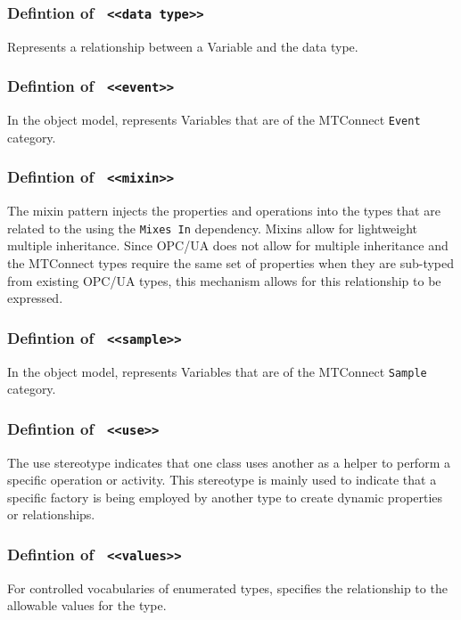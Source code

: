 \FloatBarrier
\FloatBarrier
\subsubsection{Defintion of \texttt{ <<data type>>}}
  \label{type:data type}

\FloatBarrier

Represents a relationship between a Variable and the data type.

\FloatBarrier
\subsubsection{Defintion of \texttt{ <<event>>}}
  \label{type:event}

\FloatBarrier

In the object model, represents Variables that are of the MTConnect \texttt{Event} category.

\FloatBarrier
\subsubsection{Defintion of \texttt{ <<mixin>>}}
  \label{type:mixin}

\FloatBarrier

The mixin pattern injects the properties and operations into the types 
that are related to the using the \texttt{Mixes In} dependency. Mixins allow for
lightweight multiple inheritance. Since OPC/UA does not allow for multiple inheritance 
and the MTConnect  types require the same set of properties when they are sub-typed
from existing OPC/UA types, this mechanism allows for this relationship to be expressed.


\FloatBarrier
\subsubsection{Defintion of \texttt{ <<sample>>}}
  \label{type:sample}

\FloatBarrier

In the object model, represents Variables that are of the MTConnect \texttt{Sample} category.

\FloatBarrier
\subsubsection{Defintion of \texttt{ <<use>>}}
  \label{type:use}

\FloatBarrier

The use stereotype indicates that one class uses another as a helper to perform 
a specific operation or activity. This stereotype is mainly used to indicate
that a specific factory is being employed by another type to create dynamic
properties or relationships.

\FloatBarrier
\subsubsection{Defintion of \texttt{ <<values>>}}
  \label{type:values}

\FloatBarrier

For controlled vocabularies of enumerated types, specifies the relationship to the allowable 
values for the type.

\FloatBarrier
